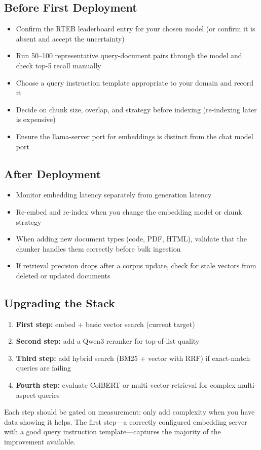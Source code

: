 \subsection{Before First Deployment}

\begin{itemize}
    \item Confirm the RTEB leaderboard entry for your chosen model (or confirm it is absent
          and accept the uncertainty)
    \item Run 50--100 representative query-document pairs through the model and check
          top-5 recall manually
    \item Choose a query instruction template appropriate to your domain and record it
    \item Decide on chunk size, overlap, and strategy before indexing (re-indexing later
          is expensive)
    \item Ensure the llama-server port for embeddings is distinct from the chat model port
\end{itemize}

\subsection{After Deployment}

\begin{itemize}
    \item Monitor embedding latency separately from generation latency
    \item Re-embed and re-index when you change the embedding model or chunk strategy
    \item When adding new document types (code, PDF, HTML), validate that the chunker handles
          them correctly before bulk ingestion
    \item If retrieval precision drops after a corpus update, check for stale vectors from
          deleted or updated documents
\end{itemize}

\subsection{Upgrading the Stack}

\begin{enumerate}
    \item \textbf{First step:} embed + basic vector search (current target)
    \item \textbf{Second step:} add a Qwen3 reranker for top-of-list quality
    \item \textbf{Third step:} add hybrid search (BM25 + vector with RRF) if exact-match
          queries are failing
    \item \textbf{Fourth step:} evaluate ColBERT or multi-vector retrieval for complex
          multi-aspect queries
\end{enumerate}

Each step should be gated on measurement: only add complexity when you have data showing it
helps. The first step---a correctly configured embedding server with a good query instruction
template---captures the majority of the improvement available.
